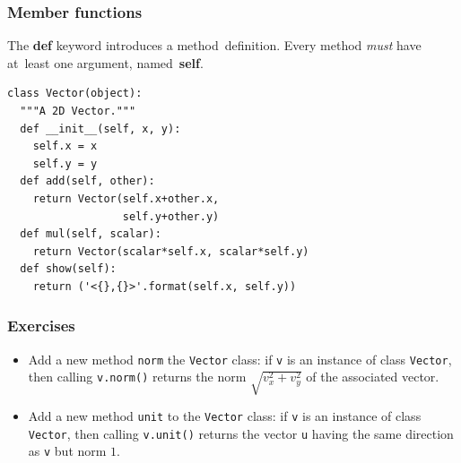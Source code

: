 \begin{frame}[fragile]\frametitle{Member functions}
      The {\bf def} keyword introduces a method~definition.
      Every method \emph{must} have at~least one argument,
      named~{\bf self}.
\begin{lstlisting}
class Vector(object):
  """A 2D Vector."""
  def __init__(self, x, y):
    self.x = x
    self.y = y
  def add(self, other):
    return Vector(self.x+other.x,
                  self.y+other.y)
  def mul(self, scalar):
    return Vector(scalar*self.x, scalar*self.y)
  def show(self):
    return ('<{},{}>'.format(self.x, self.y))
\end{lstlisting}
\end{frame}

\begin{frame}[fragile]\frametitle{Exercises}
\begin{itemize}
\item Add a new method \texttt{norm} the \texttt{Vector} class: if
    \texttt{v} is an instance of class \texttt{Vector}, then calling
    \texttt{v.norm()} returns the norm $\sqrt{v_x^2 + v_y^2}$ of
    the associated vector.
\item 
    Add a new method \texttt{unit} to the \texttt{Vector} class: if
    \texttt{v} is an instance of class \texttt{Vector}, then calling
    \texttt{v.unit()} returns the vector \texttt{u} having the
    same direction as \texttt{v} but norm $1$.
\end{itemize}
\end{frame}


